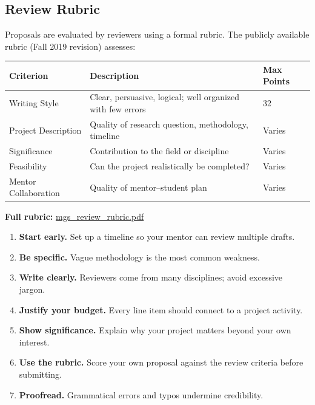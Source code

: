 \documentclass[11pt, letterpaper]{article}
\newcommand{\tipbox}[2]{%
\begin{tcolorbox}[colback=Black10, colframe=Garnet, title={\textbf{#1}}]
#2
\end{tcolorbox}
}
\begin{document}
\subsection{Review Rubric}

Proposals are evaluated by reviewers using a formal rubric. The publicly available rubric (Fall 2019 revision) assesses:

\begin{center}
\begin{tabularx}{\textwidth}{@{}l X l@{}}
\toprule
\textbf{Criterion} & \textbf{Description} & \textbf{Max Points} \\
\midrule
Writing Style & Clear, persuasive, logical; well organized with few errors & 32 \\
Project Description & Quality of research question, methodology, timeline & Varies \\
Significance & Contribution to the field or discipline & Varies \\
Feasibility & Can the project realistically be completed? & Varies \\
Mentor Collaboration & Quality of mentor--student plan & Varies \\
\bottomrule
\end{tabularx}
\end{center}

\textbf{Full rubric:} \href{https://www.sc.edu/about/offices_and_divisions/undergraduate_research/documents/mgs_review_rubric.pdf}{mgs\_review\_rubric.pdf}

\tipbox{Tips for a Strong Proposal}{
\begin{enumerate}[nosep]
    \item \textbf{Start early.} Set up a timeline so your mentor can review multiple drafts.
    \item \textbf{Be specific.} Vague methodology is the most common weakness.
    \item \textbf{Write clearly.} Reviewers come from many disciplines; avoid excessive jargon.
    \item \textbf{Justify your budget.} Every line item should connect to a project activity.
    \item \textbf{Show significance.} Explain why your project matters beyond your own interest.
    \item \textbf{Use the rubric.} Score your own proposal against the review criteria before submitting.
    \item \textbf{Proofread.} Grammatical errors and typos undermine credibility.
\end{enumerate}
}
\end{document}
